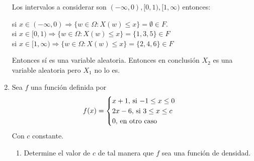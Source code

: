 \documentclass[12pt,a4paper]{report}
\begin{document}
\begin{enumerate}
{			Los intervalos a considerar son $(-\infty,0),[0,1),[1,\infty)$ entonces:\\
			\begin{center}
			    si $x\in (-\infty,0) \Rightarrow \lbrace w\in \Omega: X(w) \leq x \rbrace = \emptyset \in F. $\\
			    si $x\in [0,1) \Rightarrow \lbrace w \in \Omega: X(w) \leq x \rbrace = \lbrace 1,3,5 \rbrace \in F$  \\
			    si $x\in [1,\infty) \Rightarrow \lbrace w\in \Omega: X(w)\leq x \rbrace = \lbrace 2,4,6 \rbrace \in F$
			\end{center}
Entonces sí es una variable aleatoria. Entonces en conclusión $X_{2}$ es una variable aleatoria pero $X_{1}$ no lo es.\\			
		}
		
		\item {
			Sea $f$ una función definida por
			\[
				f(x) = \begin{cases}
								x+1, $ si $ -1 \leq x \leq 0\\
								2x-6, $ si $ 3 \leq x \leq c\\
								0, $ en otro caso$
			\end{cases}
			\]
			Con $c$ constante.
			\begin{enumerate}
				\item{
					Determine el valor de $c$ de tal manera que $f$ sea una función de
					densidad.
					
}
\end{enumerate}}
\end{enumerate}
\end{document}
